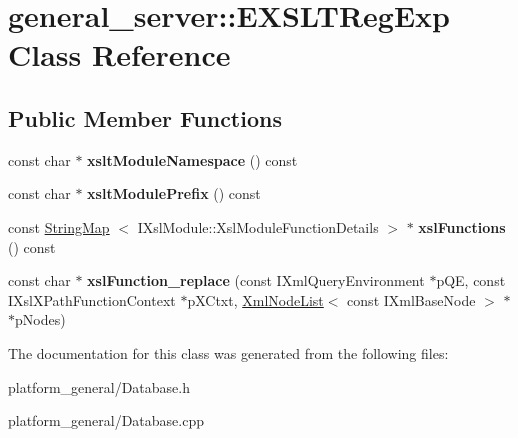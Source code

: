 \hypertarget{classgeneral__server_1_1EXSLTRegExp}{\section{general\-\_\-server\-:\-:\-E\-X\-S\-L\-T\-Reg\-Exp \-Class \-Reference}
\label{classgeneral__server_1_1EXSLTRegExp}
}
\subsection*{\-Public \-Member \-Functions}
\begin{DoxyCompactItemize}
\item 
\hypertarget{classgeneral__server_1_1EXSLTRegExp_a300e6f26384d908ad6d8d9273cf38a95}{const char $\ast$ {\bfseries xslt\-Module\-Namespace} () const }\label{classgeneral__server_1_1EXSLTRegExp_a300e6f26384d908ad6d8d9273cf38a95}

\item 
\hypertarget{classgeneral__server_1_1EXSLTRegExp_a73a170d43249f1237808f10be2bccb05}{const char $\ast$ {\bfseries xslt\-Module\-Prefix} () const }\label{classgeneral__server_1_1EXSLTRegExp_a73a170d43249f1237808f10be2bccb05}

\item 
\hypertarget{classgeneral__server_1_1EXSLTRegExp_ac53783385eaa2336b337a85ff418cf9b}{const \hyperlink{classgeneral__server_1_1StringMap}{\-String\-Map}\*
$<$ \-I\-Xsl\-Module\-::\-Xsl\-Module\-Function\-Details $>$ $\ast$ {\bfseries xsl\-Functions} () const }\label{classgeneral__server_1_1EXSLTRegExp_ac53783385eaa2336b337a85ff418cf9b}

\item 
\hypertarget{classgeneral__server_1_1EXSLTRegExp_a0d5ce1e1cabbe930c7b2123d6cce0849}{const char $\ast$ {\bfseries xsl\-Function\-\_\-replace} (const \-I\-Xml\-Query\-Environment $\ast$p\-Q\-E, const \-I\-Xsl\-X\-Path\-Function\-Context $\ast$p\-X\-Ctxt, \hyperlink{classgeneral__server_1_1XmlNodeList}{\-Xml\-Node\-List}$<$ const \-I\-Xml\-Base\-Node $>$ $\ast$$\ast$p\-Nodes)}\label{classgeneral__server_1_1EXSLTRegExp_a0d5ce1e1cabbe930c7b2123d6cce0849}

\end{DoxyCompactItemize}


\-The documentation for this class was generated from the following files\-:\begin{DoxyCompactItemize}
\item 
platform\-\_\-general/\-Database.\-h\item 
platform\-\_\-general/\-Database.\-cpp\end{DoxyCompactItemize}
